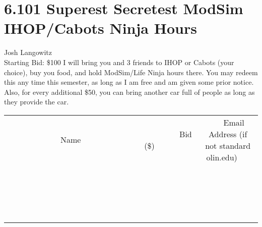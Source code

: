 \documentclass[11pt]{article}
\begin{document}
\section*{6.101 Superest Secretest ModSim IHOP/Cabots Ninja Hours}
Josh Langowitz
\\
Starting Bid: \$100
\newline
I will bring you and 3 friends to IHOP or Cabots (your choice), buy you food, and hold ModSim/Life Ninja hours there. You may redeem this any time this semester, as long as I am free and am given some prior notice. Also, for every additional \$50, you can bring another car full of people as long as they provide the car.
\\[3ex]
\begin{tabular}{c c c}
~~~~~~~~~~~~~Name~~~~~~~~~~~~~ & ~~~~~~~~~Bid (\$)~~~~~~~~~  & ~~~Email Address (if not standard olin.edu)~~~\\
 & & \\
\hline
 & & \\
\hline
 & & \\
\hline
 & & \\
\hline
 & & \\
\hline
 & & \\
\hline
 & & \\
\hline
 & & \\
\hline
 & & \\
\hline
 & & \\
\hline
 & & \\
\hline
 & & \\
\hline
 & & \\
\hline
 & & \\
\hline
 & & \\
\hline
 & & \\
\hline
 & & \\
\hline
 & & \\
\hline
 & & \\
\hline
\end{tabular}
\newpage
\end{document}
